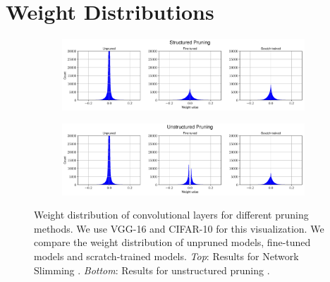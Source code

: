 \section{Weight Distributions}
\label{sec:dist}
\begin{figure}[!htbp]
\centering
\begin{minipage}{\textwidth}
 \begin{subfigure}{\textwidth}
 \centering
 \includegraphics[width=\textwidth]{figures/channel-compressed.pdf}
 \label{arch-search-b1}
 \end{subfigure}
\end{minipage}
\begin{minipage}{\textwidth}
 \begin{subfigure}{\textwidth}
 \centering
\includegraphics[width=\textwidth]{figures/weight-compressed.pdf}
 \label{arch-search-b}
 \end{subfigure}
\end{minipage}
    \vspace{-3ex}
    \caption{Weight distribution of convolutional layers for different pruning methods. We use VGG-16 and CIFAR-10 for this visualization. We compare the weight distribution of unpruned models,  fine-tuned models and scratch-trained models. \emph{Top}: Results for Network Slimming \citep{liu2017learning}. \emph{Bottom}: Results for unstructured pruning \citep{han2015learning}.}  
    \label{dist}
    \vspace{-1ex}
\end{figure}

